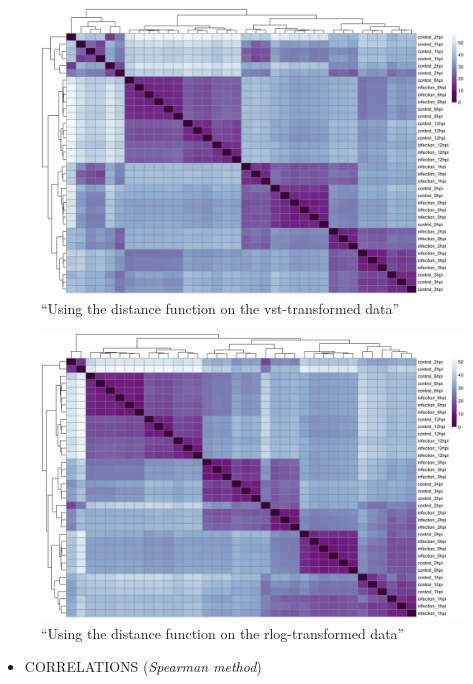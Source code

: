 \documentclass[
]{book}
\providecommand{\tightlist}{%
  \setlength{\itemsep}{0pt}\setlength{\parskip}{0pt}}
\begin{document}
\begin{figure}
\centering
\includegraphics{images/heatmap_sampleDist_vst.png}
\caption{``Using the distance function on the vst-transformed data''}
\end{figure}

\begin{figure}
\centering
\includegraphics{images/heatmap_sampleDist_Rlog.png}
\caption{``Using the distance function on the rlog-transformed data''}
\end{figure}

\begin{itemize}
\tightlist
\item
  CORRELATIONS (\emph{Spearman method})
\end{itemize}
\end{document}
